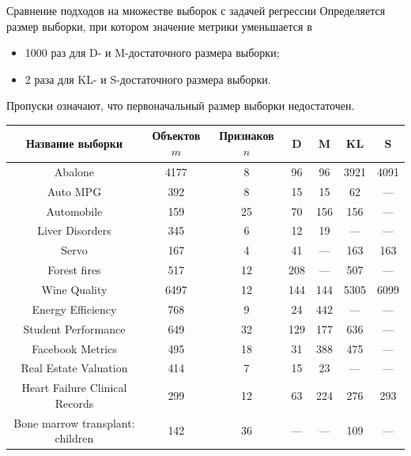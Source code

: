 \documentclass[aspectratio=169]{beamer}
\begin{document}
\begin{frame}{Сравнение подходов на множестве выборок с задачей регрессии}
    \vspace{-0.3cm}
    Определяется размер выборки, при котором значение метрики уменьшается в 
    \vspace{-0.25cm}
    \begin{itemize}
        \item 1000 раз для D- и M-достаточного размера выборки;
        \item 2 раза для KL- и S-достаточного размера выборки.
    \end{itemize}
    \vspace{-0.1cm}
    Пропуски означают, что первоначальный размер выборки недостаточен.
    \vspace{-0.3cm}
    \scriptsize
    \begin{table}
        \begin{tabular}{ccc|cc|cc}
        \toprule
        Название выборки & Объектов $m$ & Признаков $n$ & D & M & KL & S \\
        \midrule
        Abalone & 4177 & 8 & 96 & 96 & 3921 & 4091 \\
        Auto MPG & 392 & 8 & 15 & 15 & 62 & --- \\
        Automobile & 159 & 25 & 70 & 156 & 156 & --- \\
        Liver Disorders & 345 & 6 & 12 & 19 & --- & --- \\
        Servo & 167 & 4 & 41 & --- & 163 & 163 \\
        Forest fires & 517 & 12 & 208 & --- & 507 & --- \\
        Wine Quality & 6497 & 12 & 144 & 144 & 5305 & 6099 \\
        Energy Efficiency & 768 & 9 & 24 & 442 & --- & --- \\
        Student Performance & 649 & 32 & 129 & 177 & 636 & --- \\
        Facebook Metrics & 495 & 18 & 31 & 388 & 475 & ---  \\
        Real Estate Valuation & 414 & 7 & 15 & 23 & --- & --- \\
        Heart Failure Clinical Records & 299 & 12 & 63 & 224 & 276 & 293 \\
        Bone marrow transplant: children & 142 & 36 & --- & --- & 109 & --- \\
        \bottomrule
        \end{tabular}
    \end{table}
\end{frame}
\end{document}
